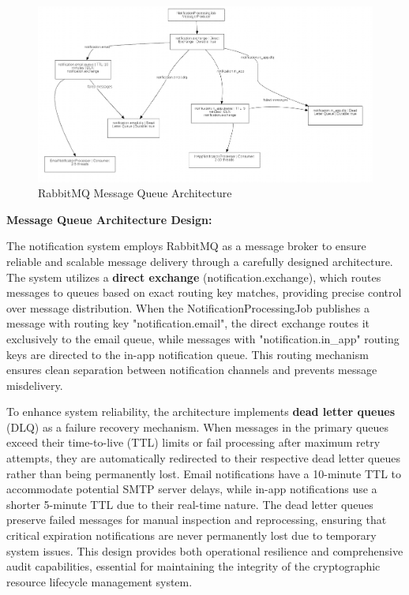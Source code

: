 \begin{figure}[H]
    \centering
    \includegraphics[width=1\textwidth]{images/rabbitmq_architecture.png}
    \caption{RabbitMQ Message Queue Architecture}
    \label{fig:rabbitmq_architecture}
\end{figure}

\textbf{Message Queue Architecture Design:}

\noindent
The notification system employs RabbitMQ as a message broker to ensure reliable and scalable message delivery through a carefully designed architecture. The system utilizes a \textbf{direct exchange} (notification.exchange), which routes messages to queues based on exact routing key matches, providing precise control over message distribution. When the NotificationProcessingJob publishes a message with routing key "notification.email", the direct exchange routes it exclusively to the email queue, while messages with "notification.in\_app" routing keys are directed to the in-app notification queue. This routing mechanism ensures clean separation between notification channels and prevents message misdelivery.

\noindent
To enhance system reliability, the architecture implements \textbf{dead letter queues} (DLQ) as a failure recovery mechanism. When messages in the primary queues exceed their time-to-live (TTL) limits or fail processing after maximum retry attempts, they are automatically redirected to their respective dead letter queues rather than being permanently lost. Email notifications have a 10-minute TTL to accommodate potential SMTP server delays, while in-app notifications use a shorter 5-minute TTL due to their real-time nature. The dead letter queues preserve failed messages for manual inspection and reprocessing, ensuring that critical expiration notifications are never permanently lost due to temporary system issues. This design provides both operational resilience and comprehensive audit capabilities, essential for maintaining the integrity of the cryptographic resource lifecycle management system.



